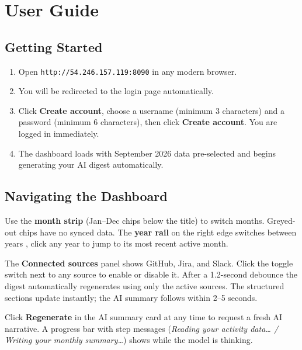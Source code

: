\documentclass[12pt,a4paper]{article}
\begin{document}
\section{User Guide}

\subsection{Getting Started}

\begin{enumerate}
  \item Open \texttt{\color{accent}http://54.246.157.119:8090} in any modern browser.
  \item You will be redirected to the login page automatically.
  \item Click \textbf{Create account}, choose a username (minimum 3 characters) and a password (minimum 6 characters), then click \textbf{Create account}. You are logged in immediately.
  \item The dashboard loads with September 2026 data pre-selected and begins generating your AI digest automatically.
\end{enumerate}

\subsection{Navigating the Dashboard}

\begin{tcolorbox}[step, title=\textbf{Month navigation}, fonttitle=\small\bfseries\color{teal}]
Use the \textbf{month strip} (Jan–Dec chips below the title) to switch months. Greyed-out chips have no synced data. The \textbf{year rail} on the right edge switches between years , click any year to jump to its most recent active month.
\end{tcolorbox}

\begin{tcolorbox}[step, title=\textbf{Source toggles}, fonttitle=\small\bfseries\color{teal}]
The \textbf{Connected sources} panel shows GitHub, Jira, and Slack. Click the toggle switch next to any source to enable or disable it. After a 1.2-second debounce the digest automatically regenerates using only the active sources. The structured sections update instantly; the AI summary follows within 2–5 seconds.
\end{tcolorbox}

\begin{tcolorbox}[step, title=\textbf{Regenerate}, fonttitle=\small\bfseries\color{teal}]
Click \textbf{Regenerate} in the AI summary card at any time to request a fresh AI narrative. A progress bar with step messages (\textit{Reading your activity data… / Writing your monthly summary…}) shows while the model is thinking.
\end{tcolorbox}
\end{document}
